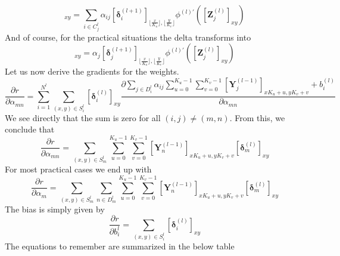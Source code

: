 \documentclass[a4paper,10pt]{article}
\theoremstyle{definition}
\begin{document}
\begin{equation}
[\pmb{\delta}_j^{(l)}]_{xy} = \sum_{i \in C_j^{l}} \alpha_{ij}[\pmb{\delta}^{(l+1)}_i]_{\lfloor \frac{x}{K_u}\rfloor, \lfloor \frac{y}{K_v} \rfloor} \phi^{(l)'}([\pmb{Z}^{(l)}_{j}]_{xy})
\end{equation}
And of course, for the practical situations the delta transforms into
\begin{equation}
[\pmb{\delta}_j^{(l)}]_{xy} = \alpha_{j}[\pmb{\delta}^{(l+1)}_j]_{\lfloor \frac{x}{K_u}\rfloor, \lfloor \frac{y}{K_v} \rfloor} \phi^{(l)'}([\pmb{Z}^{(l)}_{j}]_{xy})
\end{equation}
Let us now derive the gradients for the weights.
\begin{equation}
\frac{\partial r}{\partial \alpha_{mn}} = \sum_{i = 1}^{N^{l}}\sum_{(x,y) \in S^{l}_i} [\pmb{\delta}_i^{(l)}]_{xy} \frac{\partial \sum_{j \in D^l_i} \alpha_{ij} \sum_{u = 0}^{K_u - 1}\sum_{v = 0}^{K_v - 1} [\pmb{Y}^{(l-1)}_j]_{xK_u + u, yK_v + v} + b_i^{(l)}}{\partial \alpha_{mn}}
\end{equation}
We see directly that the sum is zero for all $(i,j) \neq (m,n)$. From this, we conclude that
\begin{equation}
\frac{\partial r}{\partial \alpha_{mn}} = \sum_{(x,y) \in S^{l}_m} \sum_{u = 0}^{K_u - 1}\sum_{v = 0}^{K_v - 1} [\pmb{Y}^{(l-1)}_n]_{xK_u + u, yK_v + v} [\pmb{\delta}_m^{(l)}]_{xy}
\end{equation}
For most practical cases we end up with
\begin{equation}
\frac{\partial r}{\partial \alpha_{m}} = \sum_{(x,y) \in S^{l}_m} \sum_{n \in D^{l}_m} \sum_{u = 0}^{K_u - 1}\sum_{v = 0}^{K_v - 1} [\pmb{Y}^{(l-1)}_n]_{xK_u + u, yK_v + v} [\pmb{\delta}_m^{(l)}]_{xy}
\end{equation}
The bias is simply given by
\begin{equation}
\frac{\partial r}{\partial b_{i}^{l}} = \sum_{(x,y) \in S^{l}_i} [\pmb{\delta}_i^{(l)}]_{xy}
\end{equation}
The equations to remember are summarized in the below table
\end{document}
